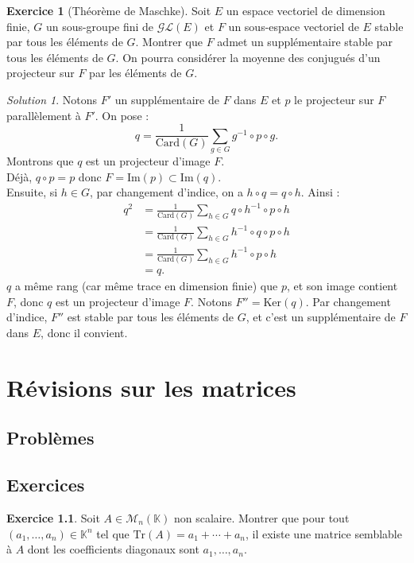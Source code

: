 \documentclass[french]{book}
\newcommand{\K}{\mathbb{K}}
\newcommand{\inv}{^{-1}}
\renewcommand{\ker}{\text{Ker}}
\newcommand{\card}{\text{Card}}
\newcommand{\Tr}{\text{Tr}}
\theoremstyle{definition}
\newtheorem{ex}{Exercice}[chapter]
\theoremstyle{remark}
\newtheorem*{sol}{Solution}
\begin{document}
\begin{ex}[Théorème de Maschke]
	Soit $E$ un espace vectoriel de dimension finie, $G$ un sous-groupe fini de $\mathcal{GL}(E)$ et $F$ un sous-espace vectoriel de $E$ stable par tous les éléments de $G$. Montrer que $F$ admet un supplémentaire stable par tous les éléments de $G$. On pourra considérer la moyenne des conjugués d'un projecteur sur $F$ par les éléments de $G$.
\end{ex}
\begin{sol}
	Notons $F'$ un supplémentaire de $F$ dans $E$ et $p$ le projecteur sur $F$ parallèlement à $F'$. On pose :
	$$q=\frac{1}{\card(G)}\sum_{g\in G}g\inv\circ p\circ g.$$
	Montrons que $q$ est un projecteur d'image $F$.\\
	Déjà, $q\circ p=p$ donc $F=\text{Im}(p)\subset\text{Im}(q)$. \\
	Ensuite, si $h\in G$, par changement d'indice, on a $h\circ q=q\circ h$. Ainsi :
	\begin{align*}
		q^2&=\frac{1}{\card(G)}\sum_{h\in G}q\circ h\inv \circ p\circ h\\
		&=\frac{1}{\card(G)}\sum_{h\in G}h\inv\circ q\circ p\circ  h\\
		&=\frac{1}{\card(G)}\sum_{h\in G}h\inv\circ p\circ  h\\
		&=q.
	\end{align*}
	$q$ a même rang (car même trace en dimension finie) que $p$, et son image contient $F$, donc $q$ est un projecteur d'image $F$. Notons $F''=\ker(q)$. Par changement d'indice, $F''$ est stable par tous les éléments de $G$, et c'est un supplémentaire de $F$ dans $E$, donc il convient.
\end{sol}

\chapter{Révisions sur les matrices}

\section{Problèmes}

\section{Exercices}

\begin{ex}
	Soit $A\in\mathcal{M}_n(\K)$ non scalaire. Montrer que pour tout $(a_1,\ldots,a_n)\in\K^n$ tel que $\Tr(A)=a_1+\cdots+a_n$, il existe une matrice semblable à $A$ dont les coefficients diagonaux sont $a_1,\ldots,a_n$.
\end{ex}
\end{document}

